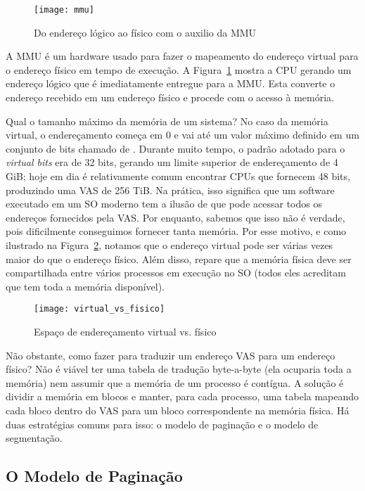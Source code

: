 \begin{figure}[!h]
  \centering
  \texttt{[image: mmu]} 
  \caption{Do endereço lógico ao físico com o auxilio da MMU}
  \label{fig:mmu}
\end{figure}

A MMU é um hardware usado para fazer o mapeamento do endereço virtual para o
endereço físico em tempo de execução. A Figura~\ref{fig:mmu} mostra a CPU
gerando um endereço lógico que é imediatamente entregue para a MMU. Esta
converte o endereço recebido em um endereço físico e procede com o acesso à
memória.

Qual o tamanho máximo da memória de um sistema?  No caso da memória virtual, o
endereçamento começa em 0 e vai até um valor máximo definido em um conjunto de
bits chamado de . Durante muito tempo, o padrão
adotado para o \emph{virtual bits} era de 32 bits, gerando um limite superior
de endereçamento de 4 GiB; hoje em dia é relativamente comum encontrar CPUs que
fornecem 48 bits, produzindo uma VAS de 256 TiB. Na prática, isso significa
que um software executado em um SO moderno tem a ilusão de que pode acessar
todos os endereços fornecidos pela VAS. Por enquanto, sabemos que isso não é
verdade, pois dificilmente conseguimos fornecer tanta memória. Por esse motivo,
e como ilustrado na Figura~\ref{fig:vas_pas}, notamos que o endereço virtual
pode ser várias vezes maior do que o endereço físico. Além disso, repare que a
memória física deve ser compartilhada entre vários processos em execução no SO
(todos eles acreditam que tem toda a memória disponível).

\begin{figure}[!h]
  \centering
  \texttt{[image: virtual\_vs\_fisico]} 
  \caption{Espaço de endereçamento virtual vs. físico}
  \label{fig:vas_pas}
\end{figure}


Não obstante, como fazer para traduzir um endereço VAS para um endereço físico?
Não é viável ter uma tabela de tradução byte-a-byte (ela ocuparia toda a
memória) nem assumir que a memória de um processo é contígua. A solução é
dividir a memória em blocos e manter, para cada processo, uma tabela mapeando
cada bloco dentro do VAS para um bloco correspondente na memória física. Há
duas estratégias comuns para isso: o modelo de paginação e o modelo de
segmentação.

\subsection{O Modelo de Paginação}
\label{sec:modelopaginacao}

